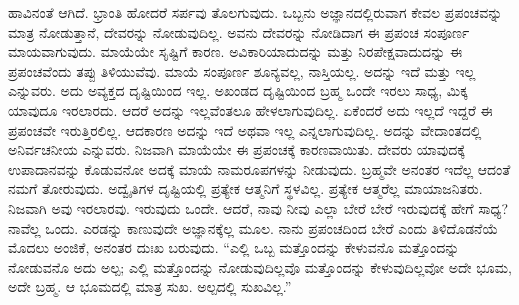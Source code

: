 ಹಾವಿನಂತೆ ಆಗಿದೆ. ಭ್ರಾಂತಿ ಹೋದರೆ ಸರ್ಪವು ತೊಲಗುವುದು. ಒಬ್ಬನು ಅಜ್ಞಾನದಲ್ಲಿರುವಾಗ ಕೇವಲ ಪ್ರಪಂಚವನ್ನು ಮಾತ್ರ ನೋಡುತ್ತಾನೆ, ದೇವರನ್ನು ನೋಡುವುದಿಲ್ಲ. ಅವನು ದೇವರನ್ನು ನೋಡಿದಾಗ ಈ ಪ್ರಪಂಚ ಸಂಪೂರ್ಣ ಮಾಯವಾಗುವುದು. ಮಾಯೆಯೇ ಸೃಷ್ಟಿಗೆ ಕಾರಣ. ಅವಿಕಾರಿಯಾದುದನ್ನು ಮತ್ತು ನಿರಪೇಕ್ಷವಾದುದನ್ನು ಈ ಪ್ರಪಂಚವೆಂದು ತಪ್ಪು ತಿಳಿಯುವೆವು. ಮಾಯೆ ಸಂಪೂರ್ಣ ಶೂನ್ಯವಲ್ಲ, ನಾಸ್ತಿಯಲ್ಲ. ಅದನ್ನು ಇದೆ ಮತ್ತು ಇಲ್ಲ ಎನ್ನುವರು. ಅದು ಅವ್ಯಕ್ತದ ದೃಷ್ಟಿಯಿಂದ ಇಲ್ಲ. ಅಖಂಡದ ದೃಷ್ಟಿಯಿಂದ ಬ್ರಹ್ಮ ಒಂದೇ ಇರಲು ಸಾಧ್ಯ, ಮಿಕ್ಕ ಯಾವುದೂ ಇರಲಾರದು. ಆದರೆ ಅದನ್ನು ಇಲ್ಲವೆಂತಲೂ ಹೇಳಲಾಗುವುದಿಲ್ಲ. ಏಕೆಂದರೆ ಅದು ಇಲ್ಲದೆ ಇದ್ದರೆ ಈ ಪ್ರಪಂಚವೇ ಇರುತ್ತಿರಲಿಲ್ಲ. ಆದಕಾರಣ ಅದನ್ನು ಇದೆ ಅಥವಾ ಇಲ್ಲ ಎನ್ನಲಾಗುವುದಿಲ್ಲ. ಅದನ್ನು ವೇದಾಂತದಲ್ಲಿ ಅನಿರ್ವಚನೀಯ ಎನ್ನುವರು. ನಿಜವಾಗಿ ಮಾಯೆಯೇ ಈ ಪ್ರಪಂಚಕ್ಕೆ ಕಾರಣವಾಯಿತು. ದೇವರು ಯಾವುದಕ್ಕೆ ಉಪಾದಾನವನ್ನು ಕೊಡುವನೋ ಅದಕ್ಕೆ ಮಾಯೆ ನಾಮರೂಪಗಳನ್ನು ನೀಡುವುದು. ಬ್ರಹ್ಮವೇ ಅನಂತರ ಇದೆಲ್ಲ ಆದಂತೆ ನಮಗೆ ತೋರುವುದು. ಅದ್ವೈತಿಗಳ ದೃಷ್ಟಿಯಲ್ಲಿ ಪ್ರತ್ಯೇಕ ಆತ್ಮನಿಗೆ ಸ್ಥಳವಿಲ್ಲ. ಪ್ರತ್ಯೇಕ ಆತ್ಮರೆಲ್ಲ ಮಾಯಾಜನಿತರು. ನಿಜವಾಗಿ ಅವು ಇರಲಾರವು. ಇರುವುದು ಒಂದೇ. ಆದರೆ, ನಾವು ನೀವು ಎಲ್ಲಾ ಬೇರೆ ಬೇರೆ ಇರುವುದಕ್ಕೆ ಹೇಗೆ ಸಾಧ್ಯ? ನಾವೆಲ್ಲ ಒಂದು. ಎರಡನ್ನು ಕಾಣುವುದೇ ಅಜ್ಞಾನಕ್ಕೆಲ್ಲ ಮೂಲ. ನಾನು ಪ್ರಪಂಚದಿಂದ ಬೇರೆ ಎಂದು ತಿಳಿದೊಡನೆಯೆ ಮೊದಲು ಅಂಜಿಕೆ, ಅನಂತರ ದುಃಖ ಬರುವುದು. “ಎಲ್ಲಿ ಒಬ್ಬ ಮತ್ತೊಂದನ್ನು ಕೇಳುವನೊ ಮತ್ತೊಂದನ್ನು ನೋಡುವನೊ ಅದು ಅಲ್ಪ; ಎಲ್ಲಿ ಮತ್ತೊಂದನ್ನು ನೋಡುವುದಿಲ್ಲವೊ ಮತ್ತೊಂದನ್ನು ಕೇಳುವುದಿಲ್ಲವೋ ಅದೇ ಭೂಮ, ಅದೇ ಬ್ರಹ್ಮ. ಆ ಭೂಮದಲ್ಲಿ ಮಾತ್ರ ಸುಖ. ಅಲ್ಪದಲ್ಲಿ ಸುಖವಿಲ್ಲ.”

